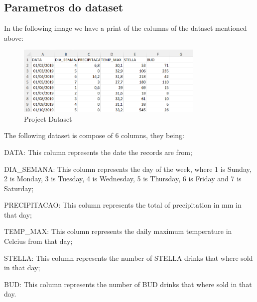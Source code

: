 \subsection{Parametros do dataset}


\quad In the following image we have a print of the columns of the dataset mentioned above:

\begin{figure}[H]
    \centering
    \includegraphics[width=0.8\textwidth]{assets/dataset.png}
    \caption{Project Dataset}
    \label{fig:dataset}
    \end{figure}

\quad The following dataset is compose of 6 columns, they being:

\quad \quad \textbullet DATA: This column represents the date the records are from;

\quad \quad \textbullet DIA\_SEMANA: This column represents the day of the week, where 1 is Sunday, 2 is Monday, 3 is Tuesday, 4 is Wednesday, 5 is Thursday, 6 is Friday and 7 is Saturday;

\quad \quad \textbullet PRECIPITACAO: This column represents the total of precipitation in mm in that day;

\quad \quad \textbullet TEMP\_MAX: This column represents the daily maximum temperature in Celcius from that day;

\quad \quad \textbullet STELLA: This column represents the number of STELLA drinks that where sold in that day;

\quad \quad \textbullet BUD: This column represents the number of BUD drinks that where sold in that day.
